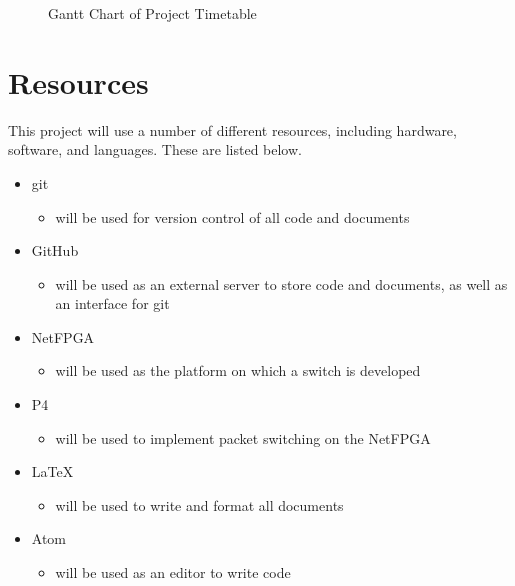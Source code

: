 \documentclass[12pt, a4paper, twoside, onecolumn]{article}
\begin{document}
\begin{landscape}
\begin{figure}[h!]
\begin{center}
{\begin{ganttchart}{1}{32}
  \end{ganttchart}}
  \caption{Gantt Chart of Project Timetable}
  \label{gantt_chart}
\end{center}
\end{figure}%
\end{landscape}


\newpage
\section{Resources}
\label{resources}
This project will use a number of different resources, including hardware, software, and languages. These are listed below.
\begin{itemize}
  \item git \cite{git}
    \begin{itemize}
      \item will be used for version control of all code and documents
    \end{itemize}
  \item GitHub \cite{github}
    \begin{itemize}
      \item will be used as an external server to store code and documents, as well as an interface for git
    \end{itemize}
  \item NetFPGA \cite{NetFPGA}
    \begin{itemize}
      \item will be used as the platform on which a switch is developed
    \end{itemize}
  \item P4 \cite{P4}
    \begin{itemize}
      \item will be used to implement packet switching on the NetFPGA
    \end{itemize}
  \item LaTeX \cite{latex}
    \begin{itemize}
      \item will be used to write and format all documents
    \end{itemize}
  \item Atom \cite{atom}
    \begin{itemize}
      \item will be used as an editor to write code
    \end{itemize}
\end{itemize}




\end{document}
